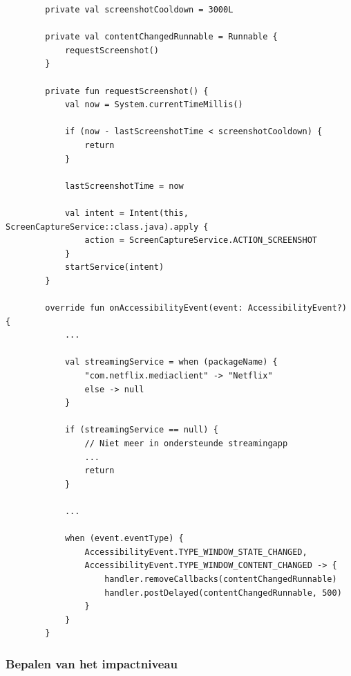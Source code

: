 \vspace{1em}

\begin{listing}
    \begin{verbatim}
        private val screenshotCooldown = 3000L
        
        private val contentChangedRunnable = Runnable {
            requestScreenshot()
        }
        
        private fun requestScreenshot() {
            val now = System.currentTimeMillis()
            
            if (now - lastScreenshotTime < screenshotCooldown) {
                return
            }
            
            lastScreenshotTime = now
            
            val intent = Intent(this, ScreenCaptureService::class.java).apply {
                action = ScreenCaptureService.ACTION_SCREENSHOT
            }
            startService(intent)
        }
        
        override fun onAccessibilityEvent(event: AccessibilityEvent?) {
            ...
            
            val streamingService = when (packageName) { 
                "com.netflix.mediaclient" -> "Netflix" 
                else -> null 
            } 
            
            if (streamingService == null) { 
                // Niet meer in ondersteunde streamingapp 
                ... 
                return 
            } 
            
            ...
            
            when (event.eventType) {
                AccessibilityEvent.TYPE_WINDOW_STATE_CHANGED,
                AccessibilityEvent.TYPE_WINDOW_CONTENT_CHANGED -> {
                    handler.removeCallbacks(contentChangedRunnable)
                    handler.postDelayed(contentChangedRunnable, 500)
                }
            }
        }
    \end{verbatim}
    \caption[Stabiliteitsperiode en cooldown voor analyses]{Vereenvoudigde weergave van de stabiliteitsperiode en cooldown die bepalen wanneer een screenshotanalyse wordt gestart.}
    \label{lst:analysis-timing}
\end{listing}

\vspace{1em}

\subsubsection{Bepalen van het impactniveau}

